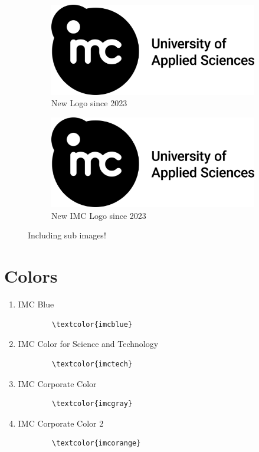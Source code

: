 \documentclass{imc-inf}
\begin{document}
\begin{figure}[ht]
	\begin{subfigure}{.5\textwidth}
		\centering
		\includegraphics[width=.8\linewidth]{imc_logo_print.jpg}  
		\caption{New Logo since 2023}
		\label{fig:sub-first}
	\end{subfigure}
	\begin{subfigure}{.5\textwidth}
		\centering
		\includegraphics[width=.8\linewidth]{imc_logo_print.jpg}  
		\caption{New IMC Logo since 2023}
		\label{fig:sub-second}
	\end{subfigure}
	\caption{Including sub images! }
	\label{fig:fig}
\end{figure}
\section{Colors}
\begin{enumerate}
\item \textcolor{imcblue}{IMC Blue}  
    \begin{verbatim}
        \textcolor{imcblue}
    \end{verbatim}
\item \textcolor{imctech}{IMC Color for Science and Technology}
    \begin{verbatim}
        \textcolor{imctech}
    \end{verbatim}
\item \textcolor{imcgray}{IMC Corporate Color}
\begin{verbatim}
        \textcolor{imcgray}
    \end{verbatim}
\item \textcolor{imcorange}{IMC Corporate Color 2}
\begin{verbatim}
        \textcolor{imcorange}
    \end{verbatim}
\end{enumerate}
\end{document}
